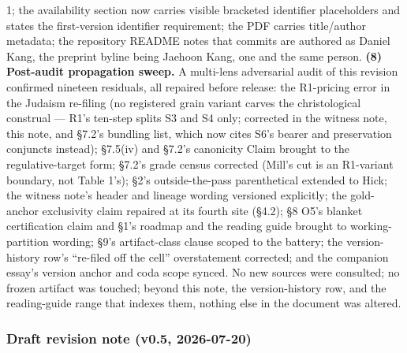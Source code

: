 1; the availability section now carries visible bracketed identifier placeholders and states the first-version identifier requirement; the PDF carries title/author metadata; the repository README notes that commits are authored as Daniel Kang, the preprint byline being Jaehoon Kang, one and the same person. \textbf{(8) Post-audit propagation sweep.} A multi-lens adversarial audit of this revision confirmed nineteen residuals, all repaired before release: the R1-pricing error in the Judaism re-filing (no registered grain variant carves the christological construal --- R1's ten-step splits S3 and S4 only; corrected in the witness note, this note, and \S{}7.2's bundling list, which now cites S6's bearer and preservation conjuncts instead); \S{}7.5(iv) and \S{}7.2's canonicity Claim brought to the regulative-target form; \S{}7.2's grade census corrected (Mill's cut is an R1-variant boundary, not Table 1's); \S{}2's outside-the-pass parenthetical extended to Hick; the witness note's header and lineage wording versioned explicitly; the gold-anchor exclusivity claim repaired at its fourth site (\S{}4.2); \S{}8 O5's blanket certification claim and \S{}1's roadmap and the reading guide brought to working-partition wording; \S{}9's artifact-class clause scoped to the battery; the version-history row's ``re-filed off the cell'' overstatement corrected; and the companion essay's version anchor and coda scope synced. No new sources were consulted; no frozen artifact was touched; beyond this note, the version-history row, and the reading-guide range that indexes them, nothing else in the document was altered.

\subsubsection{Draft revision note (v0.5, 2026-07-20)}\label{draft-revision-note-v0.5-2026-07-20}

